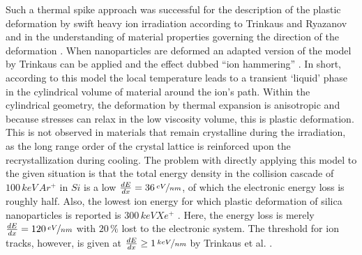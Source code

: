 Such a thermal spike approach was successful for the description of the plastic deformation by swift heavy ion irradiation according to Trinkaus and Ryazanov \cite{trinkaus_viscoelastic_1995} and in the understanding of material properties governing the direction of the deformation \cite{hedler_amorphous_2004,hedler_boundary_2005}. When nanoparticles are deformed \cite{snoeks_colloidal_2000,snoeks_colloidal_2001,van_dillen_anisotropic_2001,dillen_energy-dependent_2001,dillen_ion_2003,dillen_ion_2004} an adapted version of the model by Trinkaus can be applied and the effect dubbed ``ion hammering'' \cite{klaumunzer_ion_2004}. In short, according to this model the local temperature leads to a transient `liquid' phase in the cylindrical volume of material around the ion's path. Within the cylindrical geometry, the deformation by thermal expansion is anisotropic and because stresses can relax in the low viscosity volume, this is plastic deformation. This is not observed in materials that remain crystalline during the irradiation, as the long range order of the crystal lattice is reinforced upon the recrystallization during cooling. The problem with directly applying this model to the given situation is that the total energy density in the collision cascade of $100\,keV\,Ar^+$ in $Si$ is a low $\frac{dE}{dx} = 36\,\nicefrac{eV}{nm}$, of which the electronic energy loss is roughly half. Also, the lowest ion energy for which plastic deformation of silica nanoparticles is reported is $300\,keV Xe^+$ \cite{dillen_ion_2003}. Here, the energy loss is merely $\frac{dE}{dx} = 120\,\nicefrac{eV}{nm}$ with $20\,\%$ lost to the electronic system. The threshold for ion tracks, however, is given at $\frac{dE}{dx} \geq 1\,\nicefrac{keV}{nm}$ by Trinkaus et al. \cite{trinkaus_viscoelastic_1995}.

